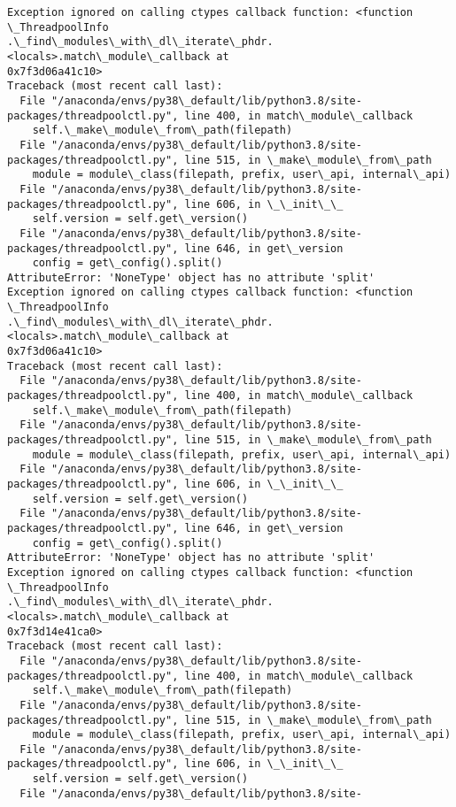 \documentclass[11pt]{article}
\begin{document}
\begin{Verbatim}[commandchars=\\\{\}]
Exception ignored on calling ctypes callback function: <function \_ThreadpoolInfo
.\_find\_modules\_with\_dl\_iterate\_phdr.<locals>.match\_module\_callback at
0x7f3d06a41c10>
Traceback (most recent call last):
  File "/anaconda/envs/py38\_default/lib/python3.8/site-
packages/threadpoolctl.py", line 400, in match\_module\_callback
    self.\_make\_module\_from\_path(filepath)
  File "/anaconda/envs/py38\_default/lib/python3.8/site-
packages/threadpoolctl.py", line 515, in \_make\_module\_from\_path
    module = module\_class(filepath, prefix, user\_api, internal\_api)
  File "/anaconda/envs/py38\_default/lib/python3.8/site-
packages/threadpoolctl.py", line 606, in \_\_init\_\_
    self.version = self.get\_version()
  File "/anaconda/envs/py38\_default/lib/python3.8/site-
packages/threadpoolctl.py", line 646, in get\_version
    config = get\_config().split()
AttributeError: 'NoneType' object has no attribute 'split'
Exception ignored on calling ctypes callback function: <function \_ThreadpoolInfo
.\_find\_modules\_with\_dl\_iterate\_phdr.<locals>.match\_module\_callback at
0x7f3d06a41c10>
Traceback (most recent call last):
  File "/anaconda/envs/py38\_default/lib/python3.8/site-
packages/threadpoolctl.py", line 400, in match\_module\_callback
    self.\_make\_module\_from\_path(filepath)
  File "/anaconda/envs/py38\_default/lib/python3.8/site-
packages/threadpoolctl.py", line 515, in \_make\_module\_from\_path
    module = module\_class(filepath, prefix, user\_api, internal\_api)
  File "/anaconda/envs/py38\_default/lib/python3.8/site-
packages/threadpoolctl.py", line 606, in \_\_init\_\_
    self.version = self.get\_version()
  File "/anaconda/envs/py38\_default/lib/python3.8/site-
packages/threadpoolctl.py", line 646, in get\_version
    config = get\_config().split()
AttributeError: 'NoneType' object has no attribute 'split'
Exception ignored on calling ctypes callback function: <function \_ThreadpoolInfo
.\_find\_modules\_with\_dl\_iterate\_phdr.<locals>.match\_module\_callback at
0x7f3d14e41ca0>
Traceback (most recent call last):
  File "/anaconda/envs/py38\_default/lib/python3.8/site-
packages/threadpoolctl.py", line 400, in match\_module\_callback
    self.\_make\_module\_from\_path(filepath)
  File "/anaconda/envs/py38\_default/lib/python3.8/site-
packages/threadpoolctl.py", line 515, in \_make\_module\_from\_path
    module = module\_class(filepath, prefix, user\_api, internal\_api)
  File "/anaconda/envs/py38\_default/lib/python3.8/site-
packages/threadpoolctl.py", line 606, in \_\_init\_\_
    self.version = self.get\_version()
  File "/anaconda/envs/py38\_default/lib/python3.8/site-

\end{Verbatim}
\end{document}
